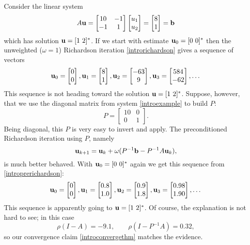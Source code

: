 \medskip\noindent\hrulefill
\begin{example} Consider the linear system
\begin{equation}
A \mathbf{u} =
\begin{bmatrix}
10 & -1 \\ -1 & 1
\end{bmatrix} 
\begin{bmatrix}
u_1 \\ u_2
\end{bmatrix}
=
\begin{bmatrix}
8 \\
1 
\end{bmatrix}
= \mathbf{b}
 \label{introexample}
\end{equation}
which has solution $\mathbf{u} = [1\,\, 2]^*$.  If we start with estimate $\mathbf{u}_0 = [0\,\, 0]^*$ then the unweighted ($\omega=1$) Richardson iteration \eqref{introrichardson} gives a sequence of vectors %
\newcommand{\rvect}[3]{\ensuremath{\bu_{#1} = \begin{bmatrix} #2 \\ #3 \end{bmatrix}}}
\begin{equation}
\rvect{0}{0}{0}, \rvect{1}{8}{1}, \rvect{2}{-63}{9}, \rvect{3}{584}{-62}, \dots
\end{equation}
This sequence is not heading toward the solution $\mathbf{u} = [1\,\, 2]^*$.  Suppose, however, that we use the diagonal matrix from system \eqref{introexample} to build $P$:
\begin{equation}
P = \begin{bmatrix}
10 & 0 \\ 0 & 1
\end{bmatrix}.  \label{introP}
\end{equation}
Being diagonal, this $P$ is very easy to invert and apply.  The preconditioned Richardson iteration using $P$, namely
\begin{equation}
\mathbf{u}_{k+1} = \mathbf{u}_k + \omega (P^{-1} \mathbf{b} - P^{-1} A \mathbf{u}_k),  \label{introprerichardson}
\end{equation}
is much better behaved.  With $\mathbf{u}_0 = [0\,\, 0]^*$ again we get this sequence from \eqref{introprerichardson}:
\begin{equation}
\rvect{0}{0}{0}, \rvect{1}{0.8}{1.0}, \rvect{2}{0.9}{1.8}, \rvect{3}{0.98}{1.90}, \dots
\end{equation}
This sequence is apparently going to $\mathbf{u} = [1\,\, 2]^*$.  Of course, the explanation is not hard to see; in this case
\begin{equation}
\rho(I-A) = -9.1, \qquad \rho(I-P^{-1} A) = 0.32,
\end{equation}
so our convergence claim \eqref{introconvergethm} matches the evidence.
\end{example}
\noindent\hrulefill


